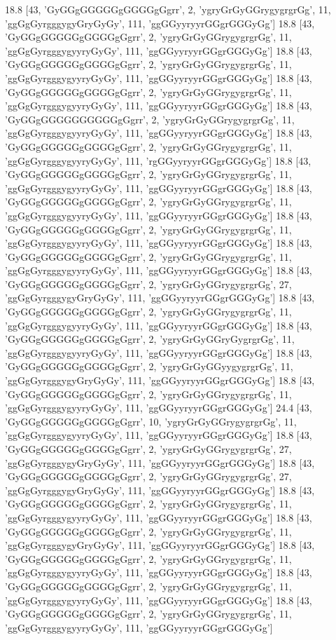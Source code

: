 18.8 [43, 'GyGGgGGGGGgGGGGgGgrr', 2, 'ygryGrGyGGrygygrgrGg', 11, 'ggGgGyrgggygyGryGyGy', 111, 'ggGGyyryyrGGgrGGGyGg']
18.8 [43, 'GyGGgGGGGGgGGGGgGgrr', 2, 'ygryGrGyGGrygygrgrGg', 11, 'ggGgGyrgggygyyryGyGy', 111, 'ggGGyyryyrGGgrGGGyGg']
18.8 [43, 'GyGGgGGGGGgGGGGgGgrr', 2, 'ygryGrGyGGrygygrgrGg', 11, 'ggGgGyrgggygyyryGyGy', 111, 'ggGGyyryyrGGgrGGGyGg']
18.8 [43, 'GyGGgGGGGGgGGGGgGgrr', 2, 'ygryGrGyGGrygygrgrGg', 11, 'ggGgGyrgggygyyryGyGy', 111, 'ggGGyyryyrGGgrGGGyGg']
18.8 [43, 'GyGGgGGGGGGGGGGgGgrr', 2, 'ygryGrGyGGrygygrgrGg', 11, 'ggGgGyrgggygyyryGyGy', 111, 'ggGGyyryyrGGgrGGGyGg']
18.8 [43, 'GyGGgGGGGGgGGGGgGgrr', 2, 'ygryGrGyGGrygygrgrGg', 11, 'ggGgGyrgggygyyryGyGy', 111, 'rgGGyyryyrGGgrGGGyGg']
18.8 [43, 'GyGGgGGGGGgGGGGgGgrr', 2, 'ygryGrGyGGrygygrgrGg', 11, 'ggGgGyrgggygyyryGyGy', 111, 'ggGGyyryyrGGgrGGGyGg']
18.8 [43, 'GyGGgGGGGGgGGGGgGgrr', 2, 'ygryGrGyGGrygygrgrGg', 11, 'ggGgGyrgggygyyryGyGy', 111, 'ggGGyyryyrGGgrGGGyGg']
18.8 [43, 'GyGGgGGGGGgGGGGgGgrr', 2, 'ygryGrGyGGrygygrgrGg', 11, 'ggGgGyrgggygyyryGyGy', 111, 'ggGGyyryyrGGgrGGGyGg']
18.8 [43, 'GyGGgGGGGGgGGGGgGgrr', 2, 'ygryGrGyGGrygygrgrGg', 11, 'ggGgGyrgggygyyryGyGy', 111, 'ggGGyyryyrGGgrGGGyGg']
18.8 [43, 'GyGGgGGGGGgGGGGgGgrr', 2, 'ygryGrGyGGrygygrgrGg', 27, 'ggGgGyrgggygyGryGyGy', 111, 'ggGGyyryyrGGgrGGGyGg']
18.8 [43, 'GyGGgGGGGGgGGGGgGgrr', 2, 'ygryGrGyGGrygygrgrGg', 11, 'ggGgGyrgggygyyryGyGy', 111, 'ggGGyyryyrGGgrGGGyGg']
18.8 [43, 'GyGGgGGGGGgGGGGgGgrr', 2, 'ygryGrGyGGryGygrgrGg', 11, 'ggGgGyrgggygyyryGyGy', 111, 'ggGGyyryyrGGgrGGGyGg']
18.8 [43, 'GyGGgGGGGGgGGGGgGgrr', 2, 'ygryGrGyGGyygygrgrGg', 11, 'ggGgGyrgggygyGryGyGy', 111, 'ggGGyyryyrGGgrGGGyGg']
18.8 [43, 'GyGGgGGGGGgGGGGgGgrr', 2, 'ygryGrGyGGrygygrgrGg', 11, 'ggGgGyrgggygyyryGyGy', 111, 'ggGGyyryyrGGgrGGGyGg']
24.4 [43, 'GyGGgGGGGGgGGGGgGgrr', 10, 'ygryGrGyGGrygygrgrGg', 11, 'ggGgGyrgggygyyryGyGy', 111, 'ggGGyyryyrGGgrGGGyGg']
18.8 [43, 'GyGGgGGGGGgGGGGgGgrr', 2, 'ygryGrGyGGrygygrgrGg', 27, 'ggGgGyrgggygyGryGyGy', 111, 'ggGGyyryyrGGgrGGGyGg']
18.8 [43, 'GyGGgGGGGGgGGGGgGgrr', 2, 'ygryGrGyGGrygygrgrGg', 27, 'ggGgGyrgggygyGryGyGy', 111, 'ggGGyyryyrGGgrGGGyGg']
18.8 [43, 'GyGGgGGGGGgGGGGgGgrr', 2, 'ygryGrGyGGrygygrgrGg', 11, 'ggGgGyrgggygyyryGyGy', 111, 'ggGGyyryyrGGgrGGGyGg']
18.8 [43, 'GyGGgGGGGGgGGGGgGgrr', 2, 'ygryGrGyGGrygygrgrGg', 11, 'ggGgGyrgggygyGryGyGy', 111, 'ggGGyyryyrGGgrGGGyGg']
18.8 [43, 'GyGGgGGGGGgGGGGgGgrr', 2, 'ygryGrGyGGrygygrgrGg', 11, 'ggGgGyrgggygyyryGyGy', 111, 'ggGGyyryyrGGgrGGGyGg']
18.8 [43, 'GyGGgGGGGGgGGGGgGgrr', 2, 'ygryGrGyGGrygygrgrGg', 11, 'ggGgGyrgggygyyryGyGy', 111, 'ggGGyyryyrGGgrGGGyGg']
18.8 [43, 'GyGGgGGGGGgGGGGgGgrr', 2, 'ygryGrGyGGrygygrgrGg', 11, 'ggGgGyrgggygyyryGyGy', 111, 'ggGGyyryyrGGgrGGGyGg']
